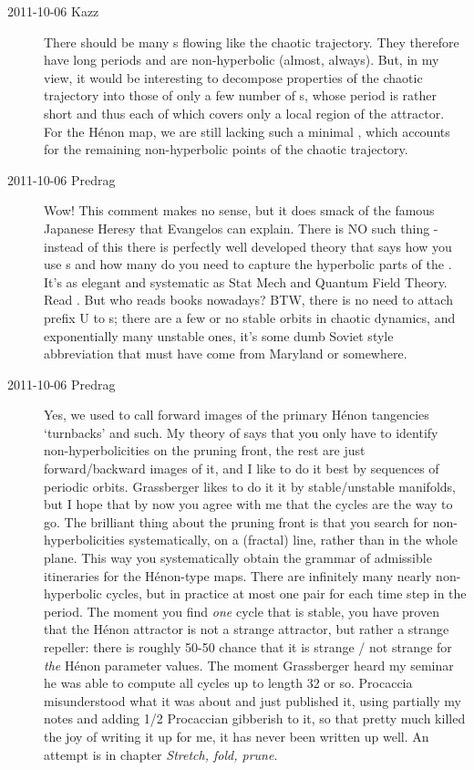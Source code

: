 \begin{description}
\item[2011-10-06 Kazz]
There should be many \po s flowing like the chaotic trajectory. They
therefore have long periods and are non-hyperbolic (almost, always). But,
in my view, it would be interesting to decompose properties of the
chaotic trajectory into those of only a few number of \po s, whose period
is rather short and thus each of which covers only a local region of the
attractor. For the H\'enon map, we are still lacking such a minimal \po,
which accounts for the remaining non-hyperbolic points of the chaotic
trajectory.

\item[2011-10-06 Predrag]
Wow! This comment makes no sense, but it does smack of the famous
Japanese Heresy that Evangelos can explain. There is NO such thing -
instead of this there is perfectly well developed theory that says how
you use \po s and how many do you need to capture the hyperbolic parts of
the {\nws}. It's as elegant and systematic as Stat Mech and Quantum Field
Theory. Read . But who reads books
nowadays? BTW, there is no need to attach prefix U to \po s; there are a
few or no stable orbits in chaotic dynamics, and exponentially many
unstable ones, it's some dumb Soviet style abbreviation that must have
come from Maryland or somewhere.

\item[2011-10-06 Predrag]
Yes, we used to call forward images of the primary H\'enon tangencies
`turnbacks' and such. My theory of
 says that you only have to identify non-hyperbolicities on the
pruning front, the rest are just forward/backward images of it, and I
like to do it best by sequences of periodic orbits. Grassberger likes to
do it it by stable/unstable manifolds, but I hope that by now you agree
with me that the cycles are the way to go. The brilliant thing about the
pruning front is that you search for non-hyperbolicities systematically,
on a (fractal) line, rather than in the whole plane. This way you
systematically obtain the grammar of admissible itineraries for the
H\'enon-type maps. There are infinitely many nearly non-hyperbolic
cycles, but in practice at most one pair for each time step in the
period. The moment you find \emph{one} cycle that is stable, you have
proven that the H\'enon attractor is not a strange attractor, but rather
a strange repeller: there is roughly 50-50 chance that it is strange /
not strange for \emph{the} H\'enon parameter values. The moment
Grassberger heard my seminar he was able to compute all cycles up to
length 32 or so. Procaccia misunderstood what it was about and just
published it, using partially my notes and adding 1/2
Procaccian gibberish to it, so that pretty much killed the joy of writing
it up for me, it has never been written up well. An attempt is in
 chapter
{\em Stretch, fold, prune}.


\end{description}
